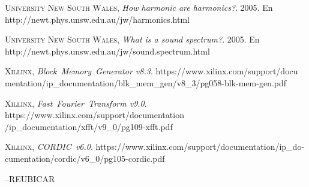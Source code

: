 \documentclass[a4paper, 11pt, oneside, openright]{report}
\begin{document}
\begin{thebibliography}{aa}
	
	\textsc{University New South Wales},
	\textit{How harmonic are harmonics?}. 2005. En
	http://newt.phys.unsw.edu.au/jw/harmonics.html
	
	\textsc{University New South Wales},
	\textit{What is a sound spectrum?}. 2005. En
	http://newt.phys.unsw.edu.au/jw/sound.spectrum.html
	
	\textsc{Xillinx},
	\textit{Block~Memory~Generator v8.3}. https://www.xilinx.com/support/docu mentation/ip\_documentation/blk\_mem\_gen/v8\_3/pg058-blk-mem-gen.pdf
	
	\textsc{Xillinx},
	\textit{Fast~Fourier~Transform v9.0}. https://www.xilinx.com/support/documentation\\/ip\_documentation/xfft/v9\_0/pg109-xfft.pdf
	
	\textsc{Xillinx},
	\textit{CORDIC~v6.0}. https://www.xilinx.com/support/documentation/ip\_do-\\cumentation/cordic/v6\_0/pg105-cordic.pdf
	

	
--REUBICAR



\end{thebibliography}
\end{document}
